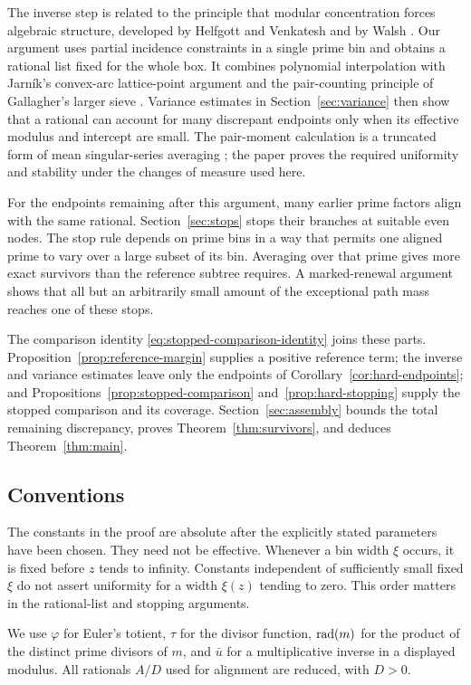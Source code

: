 The inverse step is related to the principle that modular
concentration forces algebraic structure, developed by Helfgott and
Venkatesh and by Walsh
\cite{HelfgottVenkatesh2009,Walsh2012}.
Our argument uses partial incidence constraints in a single prime bin
and obtains a rational list fixed for the whole box.
It combines polynomial interpolation with Jarn\'{i}k's
convex-arc lattice-point argument \cite{Jarnik1926} and the
pair-counting principle of Gallagher's larger sieve
\cite{Gallagher1971}.
Variance estimates in Section~\ref{sec:variance} then show that a
rational can account for many discrepant endpoints only when its
effective modulus and intercept are small. The pair-moment calculation
is a truncated form of mean singular-series averaging
\cite{Gallagher1976}; the paper proves the required uniformity and
stability under the changes of measure used here.

For the endpoints remaining after this argument, many earlier prime
factors align with the same rational. Section~\ref{sec:stops} stops
their branches at suitable even nodes. The stop rule depends on prime
bins in a way that permits one aligned prime to vary over a large
subset of its bin. Averaging over that prime gives more exact
survivors than the reference subtree requires. A marked-renewal
argument shows that all but an arbitrarily small amount of the
exceptional path mass reaches one of these stops.

The comparison identity \eqref{eq:stopped-comparison-identity} joins
these parts. Proposition~\ref{prop:reference-margin} supplies a positive
reference term; the inverse and variance estimates leave only the
endpoints of Corollary~\ref{cor:hard-endpoints}; and
Propositions~\ref{prop:stopped-comparison} and~\ref{prop:hard-stopping}
supply the stopped comparison and its coverage.
Section~\ref{sec:assembly} bounds the total remaining discrepancy,
proves Theorem~\ref{thm:survivors}, and deduces Theorem~\ref{thm:main}.

\subsection*{Conventions}

The constants in the proof are absolute after the explicitly stated
parameters have been chosen. They need not be effective. Whenever a
bin width $\xi$ occurs, it is fixed before $z$ tends to infinity.
Constants independent of sufficiently small fixed $\xi$ do not assert
uniformity for a width $\xi(z)$ tending to zero. This order matters
in the rational-list and stopping arguments.

We use $\varphi$ for Euler's totient, $\tau$ for the divisor function,
$\operatorname{rad}(m)$ for the product of the distinct prime divisors of $m$, and
$\bar u$ for a multiplicative inverse in a displayed modulus. All
rationals $A/D$ used for alignment are reduced, with $D>0$.
